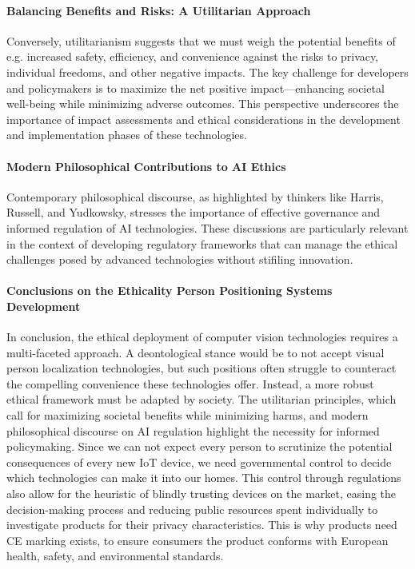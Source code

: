 \paragraph{Balancing Benefits and Risks: A Utilitarian Approach}
Conversely, utilitarianism suggests that we must weigh the potential benefits of e.g. increased safety, efficiency, and convenience against the risks to privacy, individual freedoms, and other negative impacts. The key challenge for developers and policymakers is to maximize the net positive impact—enhancing societal well-being while minimizing adverse outcomes. This perspective underscores the importance of impact assessments and ethical considerations in the development and implementation phases of these technologies.

\paragraph{Modern Philosophical Contributions to AI Ethics}
Contemporary philosophical discourse, as highlighted by thinkers like Harris, Russell, and Yudkowsky, stresses the importance of effective governance and informed regulation of AI technologies. These discussions are particularly relevant in the context of developing regulatory frameworks that can manage the ethical challenges posed by advanced technologies without stifiling innovation.

\paragraph{Conclusions on the Ethicality Person Positioning Systems Development}
In conclusion, the ethical deployment of computer vision technologies requires a multi-faceted approach. A deontological stance would be to not accept visual person localization technologies, but such positions often struggle to counteract the compelling convenience these technologies offer. Instead, a more robust ethical framework must be adapted by society. The utilitarian principles, which call for maximizing societal benefits while minimizing harms, and modern philosophical discourse on AI regulation highlight the necessity for informed policymaking. Since we can not expect every person to scrutinize the potential consequences of every new IoT device, we need governmental control to decide which technologies can make it into our homes. This control through regulations also allow for the heuristic of blindly trusting devices on the market, easing the decision-making process and reducing public resources spent individually to investigate products for their privacy characteristics. This is why products need CE marking exists, to ensure consumers the product conforms with European health, safety, and environmental standards. 

